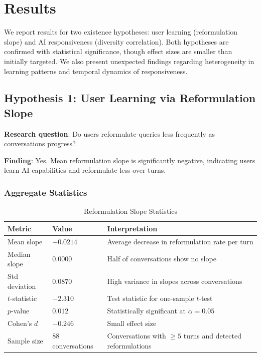 \section{Results}
\label{sec:results}

We report results for two existence hypotheses: user learning (reformulation slope) and AI responsiveness (diversity correlation). Both hypotheses are confirmed with statistical significance, though effect sizes are smaller than initially targeted. We also present unexpected findings regarding heterogeneity in learning patterns and temporal dynamics of responsiveness.

\subsection{Hypothesis 1: User Learning via Reformulation Slope}

\textbf{Research question}: Do users reformulate queries less frequently as conversations progress?

\textbf{Finding}: Yes. Mean reformulation slope is significantly negative, indicating users learn AI capabilities and reformulate less over turns.

\subsubsection{Aggregate Statistics}

\begin{table}[h]
\centering
\caption{Reformulation Slope Statistics}
\label{tab:slope_stats}
\begin{tabular}{lll}
\toprule
Metric & Value & Interpretation \\
\midrule
Mean slope & $-0.0214$ & Average decrease in reformulation rate per turn \\
Median slope & $0.0000$ & Half of conversations show no slope \\
Std deviation & $0.0870$ & High variance in slopes across conversations \\
$t$-statistic & $-2.310$ & Test statistic for one-sample $t$-test \\
$p$-value & $0.012$ & Statistically significant at $\alpha = 0.05$ \\
Cohen's $d$ & $-0.246$ & Small effect size \\
Sample size & 88 conversations & Conversations with $\geq 5$ turns and detected reformulations \\
\bottomrule
\end{tabular}
\end{table}

